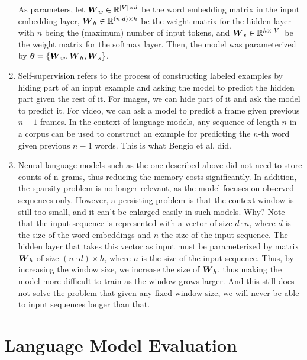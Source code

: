\documentclass[11pt,a4paper]{article}
\begin{document}
\begin{enumerate}[label=(\alph*)]
          As parameters, let ${\boldsymbol{W}}_w\in \mathbb{R}^{|V|\times d}$ be the word
          embedding matrix in the input embedding layer,
          ${\boldsymbol{W}}_h\in\mathbb{R}^{(n\cdot d)\times h}$ be the weight matrix for the
          hidden layer with $n$ being the (maximum) number of input tokens,
          and ${\boldsymbol{W}}_s\in\mathbb{R}^{h\times |V|}$ be the weight matrix for the
          softmax layer.
          Then, the model was parameterized by
          ${\boldsymbol{\theta}} = \{{\boldsymbol{W}}_w, {\boldsymbol{W}}_h, {\boldsymbol{W}}_s\}$.
    \item Self-supervision refers to the process of constructing labeled
          examples by hiding part of an input example and asking the model to
          predict the hidden part given the rest of it.
          For images, we can hide part of it and ask the model to predict it.
          For video, we can ask a model to predict a frame given previous $n-1$
          frames.
          In the context of language models, any sequence of length $n$ in a
          corpus can be used to construct an example for predicting the $n$-th
          word given previous $n-1$ words.
          This is what Bengio et al. did.
    \item Neural language models such as the one described above did not need to
          store counts of n-grams, thus reducing the memory costs significantly.
          In addition, the sparsity problem is no longer relevant, as the model
          focuses on observed sequences only.
          However, a persisting problem is that the context window is still too
          small, and it can't be enlarged easily in such models.
          Why? Note that the input sequence is represented with a vector of size
          $d\cdot n$, where $d$ is the size of the word embeddings and $n$ the
          size of the input sequence.
          The hidden layer that takes this vector as input must be parameterized
          by matrix ${\boldsymbol{W}}_h$ of size $(n\cdot d)\times h$, where $n$ is the size
          of the input sequence.
          Thus, by increasing the window size, we increase the size of ${\boldsymbol{W}}_h$,
          thus making the model more difficult to train as the window grows
          larger.
          And this still does not solve the problem that given any fixed window
          size, we will never be able to input sequences longer than that.
\end{enumerate}

\section{Language Model Evaluation}
\end{document}
